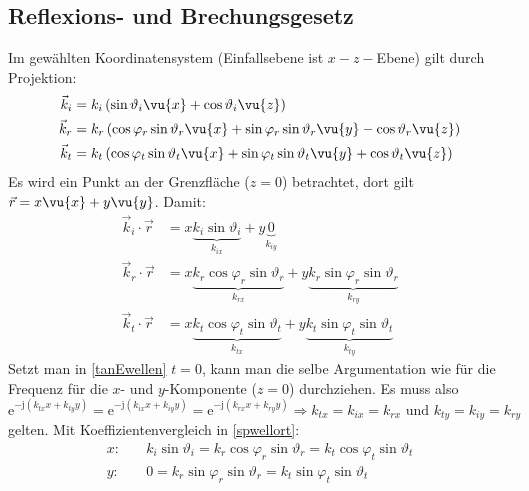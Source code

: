 \subsection{Reflexions- und Brechungsgesetz}
		  Im gewählten Koordinatensystem (Einfallsebene ist $x-z-$Ebene) gilt durch Projektion:
		        \begin{equation}\begin{split}
				        \vec{k}_i &=  k_i \left( \sin\vartheta_i\vu{x} + \cos\vartheta_i\vu{z} \right)\\
				        \vec{k}_r &=  k_r \left( \cos\varphi_r\sin\vartheta_r\vu{x} + \sin\varphi_r\sin\vartheta_r\vu{y}  - \cos\vartheta_r\vu{z}\right) \\
				        \vec{k}_t &=  k_t \left( \cos\varphi_t\sin\vartheta_t\vu{x} + \sin\varphi_t\sin\vartheta_t\vu{y}  + \cos\vartheta_t\vu{z}\right)
			        \end{split}\end{equation}
		   Es wird ein Punkt an der Grenzfläche (\(z=0\)) betrachtet, dort gilt \(\vec{r}  = x\vu{x} + y\vu{y} \). Damit:
		        \begin{equation}\label{spwellort}\begin{split}
				        \vec{k}_i\cdot\vec{r}  &= x \underbrace{k_i \sin\vartheta_i }_{k_{ix}} + y\underbrace{0}_{k_{iy}} \\
				        \vec{k}_r \cdot\vec{r} &= x \underbrace{k_r\cos\varphi_r\sin\vartheta_r}_{k_{rx}} + y\underbrace{k_r\sin\varphi_r\sin\vartheta_r}_{k_{ry}}  \\
				        \vec{k}_t \cdot\vec{r} &=  x \underbrace{k_t  \cos\varphi_t\sin\vartheta_t}_{k_{tx}} + y\underbrace{k_t \sin\varphi_t\sin\vartheta_t}_{k_{ty}}
			        \end{split}\end{equation}
		  Setzt man in \ref{tanEwellen} \(t=0\), kann man die selbe Argumentation wie für die Frequenz für die $x$- und $y$-Komponente ($z=0$) durchziehen. Es muss also 
		  \begin{equation}
		  	\mathrm{e}^{-\mathrm{j}(k_{tx}x+k_{ty}y)}=		  	\mathrm{e}^{-\mathrm{j}(k_{ix}x+k_{iy}y)}=
		  			  	\mathrm{e}^{-\mathrm{j}(k_{rx}x+k_{ry}y)} \Rightarrow \boxed{k_{tx}=k_{ix}=k_{rx}  \text{ und } k_{ty}=k_{iy}=k_{ry}}
		  \end{equation}
		  gelten. Mit Koeffizientenvergleich in \ref{spwellort}:
		        \begin{equation}\begin{split}
			        x:&\quad k_i\sin\vartheta_i =  k_r\cos\varphi_r\sin\vartheta_r = k_t\cos\varphi_t\sin\vartheta_t \\
			       y:&\quad0= k_r\sin\varphi_r\sin\vartheta_r =  k_t\sin\varphi_t\sin\vartheta_t
		        \end{split}\end{equation}
